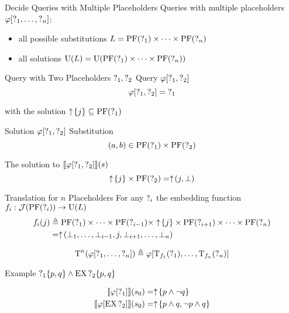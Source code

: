 \begin{frame}{Decide Queries with Multiple Placeholders}
  Queries with multiple placeholders $\phi[\qst_1,\ldots,\qst_n]$:
  \begin{itemize}
    \item all possible substitutions $L = \PF(\qst_1)\times \cdots \times \PF(\qst_n)$
    \item all solutions $\U(L) = \U(\PF(\qst_1) \times \cdots \times \PF(\qst_n))$
  \end{itemize}
\end{frame}

\begin{frame}{Query with Two Placeholders $\qst_1, \qst_2$}
  Query $\phi[\qst_1,\qst_2]$
  \[
    \phi[\qst_1,\qst_2] = \qst_1
  \]

  with the solution $\upclos{j} \subseteq \PF(\qst_1)$
\end{frame}

\begin{frame}{Solution $\phi[\qst_1,\qst_2]$}
  Substitution
  \[
    (a,b) \in \PF(\qst_1)\times \PF(\qst_2)
  \]
  
  The solution to $\llbracket \phi[\qst_1,\qst_2] \rrbracket (s)$
  \[
    \upclos{j} \times \PF(\qst_2) = \uparrow\!(j,\bot)
  \]
\end{frame}

\begin{frame}{Translation for $n$ Placeholders}
  For any $\qst_i$ the embedding function $f_i : \mcJ(\PF(\qst_i)) \to \U(L)$
  \begin{align*}
    f_i(j) &\triangleq \PF(\qst_1) \times \cdots \times \PF(\qst_{i-1}) \times
      \upclos{j} \times \PF(\qst_{i+1}) \times \cdots \times \PF(\qst_n) \\
      &= \uparrow\!(\bot_{1},\ldots,\bot_{i-1},j,\bot_{i+1},\ldots,\bot_{n})
  \end{align*}

  \[
    \T^n(\phi[\qst_1,\ldots,\qst_n]) 
    \triangleq \phi[\T_{f_1}(\qst_1),\ldots,\T_{f_n}(\qst_n)]
  \]
\end{frame}


\begin{frame}{Example $\qst_1\{p,q\} \land \EX\qst_2\{p,q\}$}
  
  \begin{align*}
    \llbracket \phi[\qst_1] \rrbracket (s_0) &= \upclos{p \land \lnot q} \\
    \llbracket \phi[\EX\qst_2] \rrbracket (s_0) &= \upclos{p \land q, \lnot p \land q}
  \end{align*}
\end{frame}

